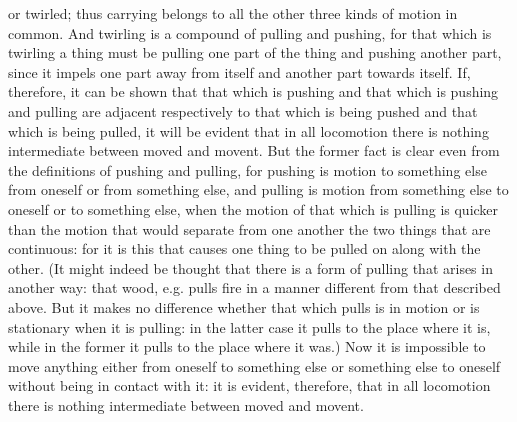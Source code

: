 or twirled; thus carrying belongs to all the other three kinds of
motion in common. And twirling is a compound of pulling and pushing,
for that which is twirling a thing must be pulling one part of the
thing and pushing another part, since it impels one part away from
itself and another part towards itself. If, therefore, it can be shown
that that which is pushing and that which is pushing and pulling are
adjacent respectively to that which is being pushed and that which
is being pulled, it will be evident that in all locomotion there is
nothing intermediate between moved and movent. But the former fact
is clear even from the definitions of pushing and pulling, for pushing
is motion to something else from oneself or from something else, and
pulling is motion from something else to oneself or to something else,
when the motion of that which is pulling is quicker than the motion
that would separate from one another the two things that are continuous:
for it is this that causes one thing to be pulled on along with the
other. (It might indeed be thought that there is a form of pulling
that arises in another way: that wood, e.g. pulls fire in a manner
different from that described above. But it makes no difference whether
that which pulls is in motion or is stationary when it is pulling:
in the latter case it pulls to the place where it is, while in the
former it pulls to the place where it was.) Now it is impossible to
move anything either from oneself to something else or something else
to oneself without being in contact with it: it is evident, therefore,
that in all locomotion there is nothing intermediate between moved
and movent. 

